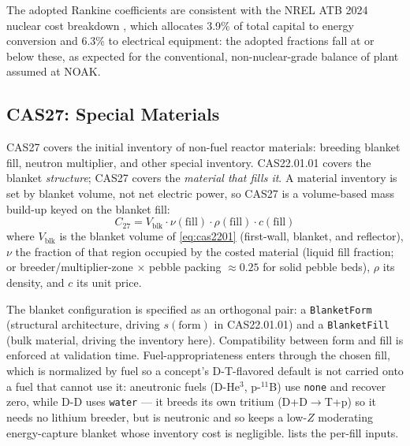 \documentclass{article}
\begin{document}
The adopted Rankine coefficients are consistent with the NREL ATB 2024
nuclear cost breakdown \citep{nrel_atb2024}, which allocates 3.9\% of total
capital to energy conversion and 6.3\% to electrical equipment: the adopted
fractions fall at or below these, as expected for the conventional,
non-nuclear-grade balance of plant assumed at NOAK.


\subsection{CAS27: Special Materials}
\label{sec:cas27}

CAS27 covers the initial inventory of non-fuel reactor materials:
breeding blanket fill, neutron multiplier, and other special inventory.
CAS22.01.01 covers the blanket \textit{structure}; CAS27 covers the
\textit{material that fills it}. A material inventory is set by blanket
volume, not net electric power, so CAS27 is a volume-based mass build-up
keyed on the blanket fill:
\begin{equation}
\label{eq:cas27}
C_{27} = V_{\text{blk}} \cdot \nu(\mathrm{fill}) \cdot \rho(\mathrm{fill}) \cdot c(\mathrm{fill})
\end{equation}
where $V_{\text{blk}}$ is the blanket volume of \cref{eq:cas2201}
(first-wall, blanket, and reflector),
$\nu$ the fraction of that region occupied by the costed material
(liquid fill fraction; or breeder/multiplier-zone $\times$ pebble
packing $\approx 0.25$ for solid pebble beds), $\rho$ its density, and
$c$ its unit price.

The blanket configuration is specified as an orthogonal pair: a
\texttt{BlanketForm} (structural architecture, driving
$s(\mathrm{form})$ in CAS22.01.01) and a \texttt{BlanketFill} (bulk
material, driving the inventory here). Compatibility between form and
fill is enforced at validation time. Fuel-appropriateness enters
through the chosen fill, which is normalized by fuel so a concept's
D-T-flavored default is not carried onto a fuel that cannot use it:
aneutronic fuels (D-He$^3$, p-$^{11}$B) use \texttt{none} and recover
zero, while D-D uses \texttt{water} --- it breeds its own tritium
(D+D$\rightarrow$T+p) so it needs no lithium breeder, but is neutronic
and so keeps a low-$Z$ moderating energy-capture blanket whose inventory
cost is negligible.  lists the per-fill inputs.
\end{document}
